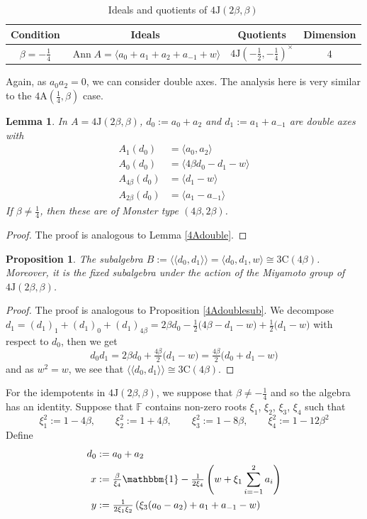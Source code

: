 \documentclass[11pt, a4paper]{article}
\theoremstyle{plain}
\newtheorem{lemma}[theorem]{Lemma}
\newtheorem{proposition}[theorem]{Proposition}
\theoremstyle{definition}
\newcommand\bt{\beta}
\newcommand\la{\langle}
\newcommand\ra{\rangle}
\newcommand\lla{\langle\!\langle}
\newcommand\rra{\rangle\!\rangle}
\DeclareMathOperator{\Ann}{Ann}
\newcommand\FF{\mathbb{F}}
\newcommand{\A}{\mathrm{A}}
\newcommand{\C}{\mathrm{C}}
\newcommand{\J}{\mathrm{J}}
\newcommand{\0}{\overline{0}}
\newcommand{\2}{\overline{2}}
\newcommand{\1}{\mathbbm{1}}
\newcommand{\rt}{\xi}
\begin{document}
\begin{table}[h!tb]
	\renewcommand{\arraystretch}{1.5}
	\centering
	\footnotesize
	\begin{tabular}{c|c|c|c}
		\hline
		Condition & Ideals & Quotients & Dimension \\
		\hline
		$\bt = -\frac{1}{4}$ & $\Ann A = \la a_0 + a_1 + a_2 + a_{-1} + w\ra$ & $4\J(-\frac{1}{2}, -\frac{1}{4})^\times$  & 4 \\
	\end{tabular}
	\caption{Ideals and quotients of $4\J(2\bt, \bt)$}\label{tab:4Jprops}
\end{table}


Again, as $a_0 a_2 = 0$, we can consider double axes.  The analysis here is very similar to the $4\A(\frac{1}{4}, \bt)$ case.

\begin{lemma}\label{4Jdouble}
In $A = 4\J(2\bt, \bt)$, $d_0 := a_0+a_2$ and $d_1 := a_1+a_{-1}$ are double axes with
\begin{align*}
A_1(d_0) &= \la a_0, a_2 \ra \\
A_0(d_0) &= \la 4\bt d_0 - d_1 -w \ra \\
A_{4\bt}(d_0) &= \la d_1-w \ra \\
A_{2\bt}(d_0) &= \la a_1 - a_{-1} \ra
\end{align*}
If $\bt \neq \frac{1}{4}$, then these are of Monster type $(4\bt, 2\beta)$.
\end{lemma}
\begin{proof}
The proof is analogous to Lemma \ref{4Adouble}.
\end{proof}


\begin{proposition}\label{4Jdoublesub}
The subalgebra $B := \lla d_0, d_1 \rra = \la d_0,d_1,w \ra \cong 3\C(4\bt)$.  Moreover, it is the fixed subalgebra under the action of the Miyamoto group of $4\J(2\bt, \bt)$.
\end{proposition}
\begin{proof}
The proof is analogous to Proposition \ref{4Adoublesub}.  We decompose $d_1 = (d_1)_1 + (d_1)_0 + (d_1)_{4\bt} = 2\bt d_0 -\frac{1}{2}\big(4\bt -d_1-w \big) + \frac{1}{2} \big( d_1-w \big)$ with respect to $d_0$, then we get
\[
d_0d_1 = 2\bt d_0 + \tfrac{4\bt}{2}\big(d_1-w\big) = \tfrac{4\bt}{2}\big(d_0+d_1-w\big)
\]
and as $w^2=w$, we see that $\lla d_0,d_1 \rra \cong 3\C(4\bt)$.
\end{proof}
	
For the idempotents in $4\J(2\bt, \bt)$, we suppose that $\bt \neq -\frac{1}{4}$ and so the algebra has an identity.  Suppose that $\FF$ contains non-zero roots $\rt_1$, $\rt_2$, $\rt_3$, $\rt_4$ such that
\[
\rt_1^2 := 1-4\bt , \qquad \rt_2^2 := 1+4\bt, \qquad  \rt_3^2 := 1-8\bt , \qquad \rt_4^2 := 1-12\bt^2
\]
Define
\begin{align*}
	d_0 &:= a_0+a_2 \\
	x &:= \tfrac{\bt}{\rt_4}\1 -\tfrac{1}{2\rt_4}\left(w+\rt_1\sum_{i=-1}^{2}a_i\right)\\
	y &:=  \tfrac{1}{2\rt_1\rt_2}\left(\rt_3(a_0-a_2)+a_1+a_{-1}-w\right)
\end{align*}
\end{document}
